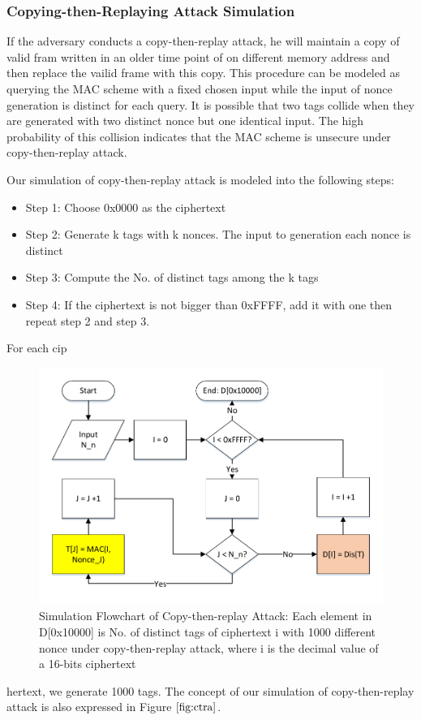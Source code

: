 \documentclass{article}
\begin{document}
\subsubsection{Copying-then-Replaying Attack Simulation}
If the adversary conducts a copy-then-replay attack, he will maintain a copy of valid fram written in an older time point of on different memory address and then replace the vailid frame with this copy. This procedure can be modeled as querying the MAC scheme with a fixed chosen input while the input of nonce generation is distinct for each query. It is possible that two tags collide when they are generated with two distinct nonce but one identical input. The high probability of this collision indicates that the MAC scheme is unsecure under copy-then-replay attack.  

Our simulation of copy-then-replay attack is modeled into the following steps:
\begin{itemize}
	\item Step 1: Choose 0x0000 as the ciphertext 
	\item Step 2: Generate k tags with k nonces. The input to generation each nonce is distinct
	\item Step 3: Compute the No. of distinct tags among the k tags
	\item Step 4: If the ciphertext is not bigger than 0xFFFF, add it with one then repeat step 2 and step 3.
\end{itemize}
For each cip\begin{figure}[htbp]
 \centering
 \includegraphics[scale=0.4]{./diagrams/replay_attack.pdf}
 \caption{Simulation Flowchart of Copy-then-replay Attack: Each element in D[0x10000] is No. of distinct tags of ciphertext i with 1000 different nonce under copy-then-replay attack, where i is the decimal value of a 16-bits ciphertext}
 \label{fig:ctra}
\end{figure}hertext, we generate 1000 tags. The concept of our simulation of copy-then-replay attack is also expressed in Figure $\ref{fig:ctra}$.
\end{document}
